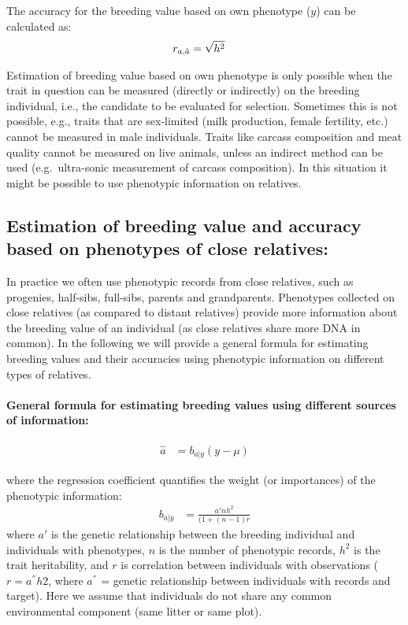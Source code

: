 \documentclass[
]{article}
\begin{document}
The accuracy for the breeding value based on own phenotype (\(y\)) can be calculated as:
\begin{align}
            r_{a,\hat{a}} &= \sqrt{h^2} \notag
\end{align}

Estimation of breeding value based on own phenotype is only possible when the trait in question can be measured (directly or indirectly) on the breeding individual, i.e., the candidate to be evaluated for selection. Sometimes this is not possible, e.g., traits that are sex-limited (milk production, female fertility, etc.) cannot be measured in male individuals. Traits like carcass composition and meat quality cannot be measured on live animals, unless an indirect method can be used (e.g.~ultra-sonic measurement of carcass composition). In this situation it might be possible to use phenotypic information on relatives.

\subsection{Estimation of breeding value and accuracy based on phenotypes of close relatives:}\label{estimation-of-breeding-value-and-accuracy-based-on-phenotypes-of-close-relatives}

In practice we often use phenotypic records from close relatives, such as progenies, half-sibs, full-sibs, parents and grandparents. Phenotypes collected on close relatives (as compared to distant relatives) provide more information about the breeding value of an individual (as close relatives share more DNA in common). In the following we will provide a general formula for estimating breeding values and their accuracies using phenotypic information on different types of relatives.

\paragraph*{General formula for estimating breeding values using different sources of information:}\label{general-formula-for-estimating-breeding-values-using-different-sources-of-information}

\begin{align}
\hat{a}&=b_{a|y}(y-\mu) 
\end{align}

where the regression coefficient quantifies the weight (or importances) of the phenotypic information:
\begin{align}
b_{a|y}&=\frac{a'nh^2}{(1+(n-1)r} 
\end{align}
where \(a'\) is the genetic relationship between the breeding individual and individuals with phenotypes, \(n\) is the number of phenotypic records, \(h^2\) is the trait heritability, and \(r\) is correlation between individuals with observations (\(r = a^{''}h2\), where \(a^{''}\) = genetic relationship between individuals with records and target). Here we assume that individuals do not share any common environmental component (same litter or same plot).
\end{document}
